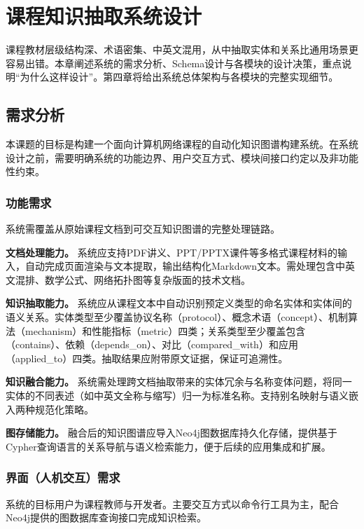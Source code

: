 \section{课程知识抽取系统设计}

课程教材层级结构深、术语密集、中英文混用，从中抽取实体和关系比通用场景更容易出错。本章阐述系统的需求分析、Schema设计与各模块的设计决策，重点说明“为什么这样设计”。第四章将给出系统总体架构与各模块的完整实现细节。

\subsection{需求分析}

本课题的目标是构建一个面向计算机网络课程的自动化知识图谱构建系统。在系统设计之前，需要明确系统的功能边界、用户交互方式、模块间接口约定以及非功能性约束。

\subsubsection{功能需求}

系统需覆盖从原始课程文档到可交互知识图谱的完整处理链路。

\textbf{文档处理能力。} 系统应支持PDF讲义、PPT/PPTX课件等多格式课程材料的输入，自动完成页面渲染与文本提取，输出结构化Markdown文本。需处理包含中英文混排、数学公式、网络拓扑图等复杂版面的技术文档。

\textbf{知识抽取能力。} 系统应从课程文本中自动识别预定义类型的命名实体和实体间的语义关系。实体类型至少覆盖协议名称（protocol）、概念术语（concept）、机制算法（mechanism）和性能指标（metric）四类；关系类型至少覆盖包含（contains）、依赖（depends\_on）、对比（compared\_with）和应用（applied\_to）四类。抽取结果应附带原文证据，保证可追溯性。

\textbf{知识融合能力。} 系统需处理跨文档抽取带来的实体冗余与名称变体问题，将同一实体的不同表述（如中英文全称与缩写）归一为标准名称。支持别名映射与语义嵌入两种规范化策略。

\textbf{图存储能力。} 融合后的知识图谱应导入Neo4j图数据库持久化存储，提供基于Cypher查询语言的关系导航与语义检索能力，便于后续的应用集成和扩展。

\subsubsection{界面（人机交互）需求}

系统的目标用户为课程教师与开发者。主要交互方式以命令行工具为主，配合Neo4j提供的图数据库查询接口完成知识检索。

